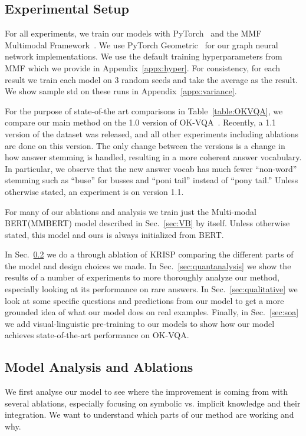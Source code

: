 \documentclass[final]{cvpr}
\providecommand{\ModelName}{KRISP\xspace}
\providecommand{\MMBERTLong}{Multi-modal BERT\xspace}
\providecommand{\MMBERTAbr}{MMBERT\xspace}
\providecommand{\sectionvspace}{\vspace{-0cm}}
\begin{document}
\subsection{Experimental Setup}
\label{sec:setup}
\sectionvspace
For all experiments, we train our models with  PyTorch~\cite{paszke2019pytorch} and the MMF Multimodal Framework~\cite{singh2020mmf}. We use PyTorch Geometric~\cite{fey2019fast} for our graph neural network implementations. We use the default training hyperparameters from MMF which we provide in Appendix~\ref{appx:hyper}. For consistency, for each result we train each model on $3$ random seeds and take the average as the result. We show sample std on these runs in Appendix~\ref{appx:variance}. 

For the purpose of state-of-the art comparisons in Table~\ref{table:OKVQA}, we compare our main method on the 1.0 version of OK-VQA~\cite{marino19cvpr}. Recently, a 1.1 version of the dataset was released, and all other experiments including ablations are done on this version. The only change between the versions is a change in how answer stemming is handled, resulting in a more coherent answer vocabulary. In particular, we observe that the new answer vocab has much fewer ``non-word'' stemming such as ``buse'' for busses and ``poni tail'' instead of ``pony tail.'' Unless otherwise stated, an experiment is on version 1.1.

For many of our ablations and analysis we train just the \MMBERTLong (\MMBERTAbr) model described in Sec.~\ref{sec:VB} by itself. Unless otherwise stated, this model and ours is always initialized from BERT.

In Sec.~\ref{sec:modelanalysis} we do a through ablation of \ModelName comparing the different parts of the model and design choices we made. In Sec.~\ref{sec:quantanalysis} we show the results of a number of experiments to more thoroughly analyze our method, especially looking at its performance on rare answers. In Sec.~\ref{sec:qualitative} we look at some specific questions and predictions from our model to get a more grounded idea of what our model does on real examples. Finally, in Sec.~\ref{sec:soa} we add visual-linguistic pre-training to our models to show how our model achieves state-of-the-art performance on OK-VQA.

\sectionvspace
\subsection{Model Analysis and Ablations}
\label{sec:modelanalysis}
\sectionvspace
We first analyse our model to see where the improvement is coming from with several ablations, especially focusing on symbolic vs. implicit knowledge and their integration. We want to understand which parts of our method are working and why.
\end{document}
